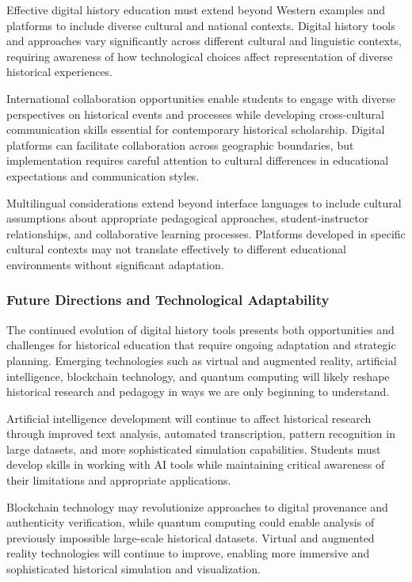Effective digital history education must extend beyond Western examples and platforms to include diverse cultural and national contexts. Digital history tools and approaches vary significantly across different cultural and linguistic contexts, requiring awareness of how technological choices affect representation of diverse historical experiences.

International collaboration opportunities enable students to engage with diverse perspectives on historical events and processes while developing cross-cultural communication skills essential for contemporary historical scholarship. Digital platforms can facilitate collaboration across geographic boundaries, but implementation requires careful attention to cultural differences in educational expectations and communication styles.

Multilingual considerations extend beyond interface languages to include cultural assumptions about appropriate pedagogical approaches, student-instructor relationships, and collaborative learning processes. Platforms developed in specific cultural contexts may not translate effectively to different educational environments without significant adaptation.

\subsubsection {Future Directions and Technological Adaptability}

The continued evolution of digital history tools presents both opportunities and challenges for historical education that require ongoing adaptation and strategic planning. Emerging technologies such as virtual and augmented reality, artificial intelligence, blockchain technology, and quantum computing will likely reshape historical research and pedagogy in ways we are only beginning to understand.

Artificial intelligence development will continue to affect historical research through improved text analysis, automated transcription, pattern recognition in large datasets, and more sophisticated simulation capabilities. Students must develop skills in working with AI tools while maintaining critical awareness of their limitations and appropriate applications.

Blockchain technology may revolutionize approaches to digital provenance and authenticity verification, while quantum computing could enable analysis of previously impossible large-scale historical datasets. Virtual and augmented reality technologies will continue to improve, enabling more immersive and sophisticated historical simulation and visualization.

